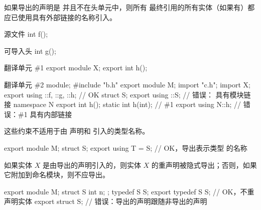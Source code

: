 \pnum
如果导出的声明是  并且不在头单元中，则所有  最终引用的所有实体（如果有）都应已使用具有外部链接的名称引入。
\begin{example}
\begin{codeblocktu}{源文件 }
int f();
\end{codeblocktu}

\begin{codeblocktu}{可导入头 }
int g();
\end{codeblocktu}

\begin{codeblocktu}{翻译单元 \#1}
export module X;
export int h();
\end{codeblocktu}

\begin{codeblocktu}{翻译单元 \#2}
module;
#include "b.h"
export module M;
import "c.h";
import X;
export using ::f, ::g, ::h;     // OK
struct S;
export using ::S;               // 错误： 具有模块链接
namespace N {
  export int h();
  static int h(int);            // \#1
}
export using N::h;              // 错误：\#1 具有内部链接
\end{codeblocktu}
\end{example}
\begin{note}
这些约束不适用于由  声明和  引入的类型名称。
\begin{example}
\begin{codeblock}
export module M;
struct S;
export using T = S;             // OK，导出表示类型  的名称 
\end{codeblock}
\end{example}
\end{note}

\pnum
如果实体 $X$ 是由导出的声明引入的，则实体 $X$ 的重声明被隐式导出；否则，如果它附加到命名模块，则不应导出。
\begin{example}
\begin{codeblock}
export module M;
struct S { int n; };
typedef S S;
export typedef S S;             // OK，不重声明实体
export struct S;                // 错误：导出的声明跟随非导出的声明
\end{codeblock}
\end{example}

